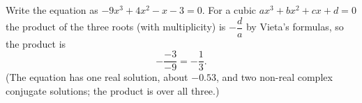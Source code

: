 Write the equation as $-9x^3+4x^2-x-3=0$. For a cubic $ax^3+bx^2+cx+d=0$ the product of the three roots (with multiplicity) is $-\dfrac da$ by Vieta's formulas, so the product is
\[-\dfrac{-3}{-9}=\boxed{-\dfrac13}.\]
(The equation has one real solution, about $-0.53$, and two non-real complex conjugate solutions; the product is over all three.)
